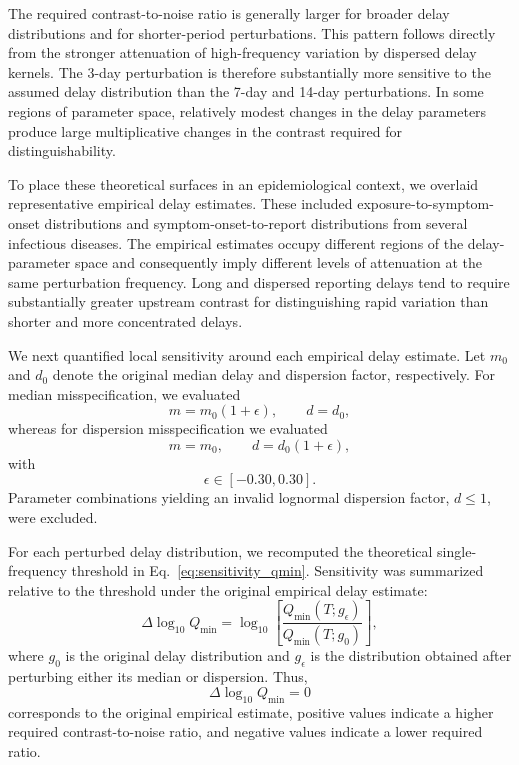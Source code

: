 The required contrast-to-noise ratio is generally larger for broader delay distributions and for shorter-period perturbations. This pattern follows directly from the stronger attenuation of high-frequency variation by dispersed delay kernels. The 3-day perturbation is therefore substantially more sensitive to the assumed delay distribution than the 7-day and 14-day perturbations. In some regions of parameter space, relatively modest changes in the delay parameters produce large multiplicative changes in the contrast required for distinguishability.

To place these theoretical surfaces in an epidemiological context, we overlaid representative empirical delay estimates. These included exposure-to-symptom-onset distributions and symptom-onset-to-report distributions from several infectious diseases. The empirical estimates occupy different regions of the delay-parameter space and consequently imply different levels of attenuation at the same perturbation frequency. Long and dispersed reporting delays tend to require substantially greater upstream contrast for distinguishing rapid variation than shorter and more concentrated delays.

We next quantified local sensitivity around each empirical delay estimate. Let \(m_0\) and \(d_0\) denote the original median delay and dispersion factor, respectively. For median misspecification, we evaluated
\[
m = m_0(1+\epsilon),
\qquad
d=d_0,
\]
whereas for dispersion misspecification we evaluated
\[
m=m_0,
\qquad
d=d_0(1+\epsilon),
\]
with
\[
\epsilon\in[-0.30,0.30].
\]
Parameter combinations yielding an invalid lognormal dispersion factor, \(d\leq 1\), were excluded.

For each perturbed delay distribution, we recomputed the theoretical single-frequency threshold in Eq.~\eqref{eq:sensitivity_qmin}. Sensitivity was summarized relative to the threshold under the original empirical delay estimate:
\begin{equation}
\Delta\log_{10} Q_{\min}
=
\log_{10}
\left[
\frac{Q_{\min}(T;g_{\epsilon})}
     {Q_{\min}(T;g_{0})}
\right],
\label{eq:sensitivity_relative_qmin}
\end{equation}
where \(g_0\) is the original delay distribution and \(g_{\epsilon}\) is the distribution obtained after perturbing either its median or dispersion. Thus,
\[
\Delta\log_{10}Q_{\min}=0
\]
corresponds to the original empirical estimate, positive values indicate a higher required contrast-to-noise ratio, and negative values indicate a lower required ratio.

